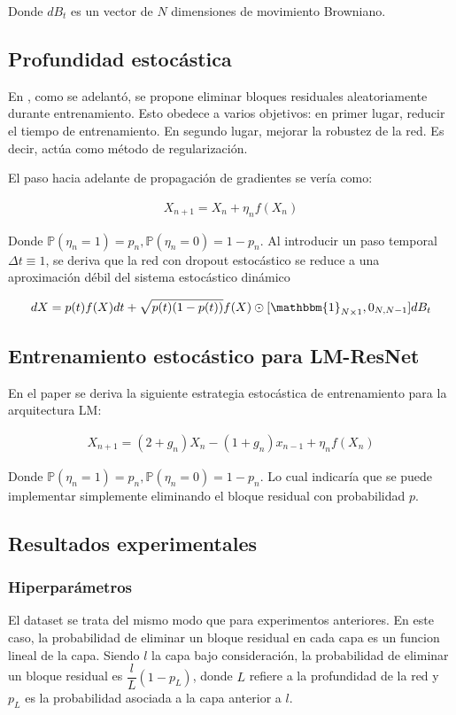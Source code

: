 \documentclass[titlepage,a4paper,oneside]{article}
\begin{document}
Donde $dB_t$ es un vector de $N$ dimensiones de movimiento Browniano.

\subsection{Profundidad estocástica}
En \cite{huang2016deep}, como se adelantó, se propone eliminar bloques residuales aleatoriamente durante entrenamiento. Esto obedece a varios objetivos: en primer lugar, reducir el tiempo de entrenamiento. En segundo lugar, mejorar la robustez de la red. Es decir, actúa como método de regularización.

El paso hacia adelante de propagación de gradientes se vería como:

\begin{align}
	X_{n+1} = X_n + \eta_n f(X_n)
\end{align}

Donde $\mathbb{P}(\eta_n = 1) = p_n, \mathbb{P}(\eta_n = 0) = 1 - p_n$. Al introducir un paso temporal $\Delta t \equiv 1$, se deriva que la red con dropout estocástico se reduce a una aproximación débil del sistema estocástico dinámico

\begin{align}
	dX = p(t) f(X) dt + \sqrt{p(t) (1-p(t))} f(X) \odot [\mathbbm{1}_{N \times 1}, 0_{N, N - 1}] dB_t
\end{align}

\subsection{Entrenamiento estocástico para LM-ResNet}
En el paper se deriva la siguiente estrategia estocástica de entrenamiento para la arquitectura LM:

\begin{align}
	X_{n+1} = (2 + g_n) X_n - (1 + g_n) x_{n-1} + \eta_n f(X_n)
\end{align}

Donde $\mathbb{P}(\eta_n = 1) = p_n, \mathbb{P}(\eta_n = 0) = 1 - p_n$. Lo cual indicaría que se puede implementar simplemente eliminando el bloque residual con probabilidad $p$.

\subsection{Resultados experimentales}
\subsubsection{Hiperparámetros}
El dataset se trata del mismo modo que para experimentos anteriores. En este caso, la probabilidad de eliminar un bloque residual en cada capa es un funcion lineal de la capa. Siendo $l$ la capa bajo consideración, la probabilidad de eliminar un bloque residual es $\dfrac{l}{L}(1 - p_L)$, donde $L$ refiere a la profundidad de la red y $p_L$ es la probabilidad asociada a la capa anterior a $l$.
\end{document}
